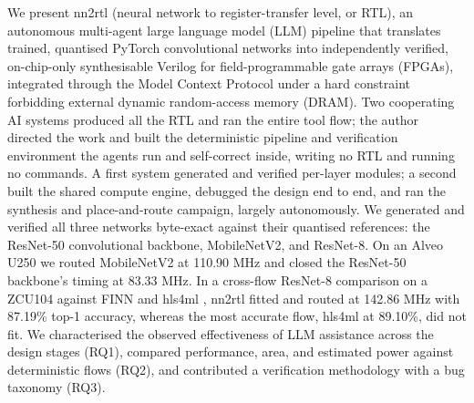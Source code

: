 We present nn2rtl (neural network to register-transfer level, or RTL), an autonomous multi-agent large language model (LLM) pipeline that translates trained, quantised PyTorch convolutional networks \cite{paszke2019} into independently verified, on-chip-only synthesisable Verilog for field-programmable gate arrays (FPGAs), integrated through the Model Context Protocol \cite{anthropic2025mcp} under a hard constraint forbidding external dynamic random-access memory (DRAM). Two cooperating AI systems produced all the RTL and ran the entire tool flow; the author directed the work and built the deterministic pipeline and verification environment the agents run and self-correct inside, writing no RTL and running no commands. A first system generated and verified per-layer modules; a second built the shared compute engine, debugged the design end to end, and ran the synthesis and place-and-route campaign, largely autonomously. We generated and verified all three networks byte-exact against their quantised references: the ResNet-50 convolutional backbone, MobileNetV2, and ResNet-8. On an Alveo U250 we routed MobileNetV2 at 110.90 MHz and closed the ResNet-50 backbone's timing at 83.33 MHz. In a cross-flow ResNet-8 comparison on a ZCU104 against FINN \cite{umuroglu2017finn} and hls4ml \cite{schulte2026hls4ml}, nn2rtl fitted and routed at 142.86 MHz with 87.19\% top-1 accuracy, whereas the most accurate flow, hls4ml at 89.10\%, did not fit. We characterised the observed effectiveness of LLM assistance across the design stages (RQ1), compared performance, area, and estimated power against deterministic flows (RQ2), and contributed a verification methodology with a bug taxonomy (RQ3).

